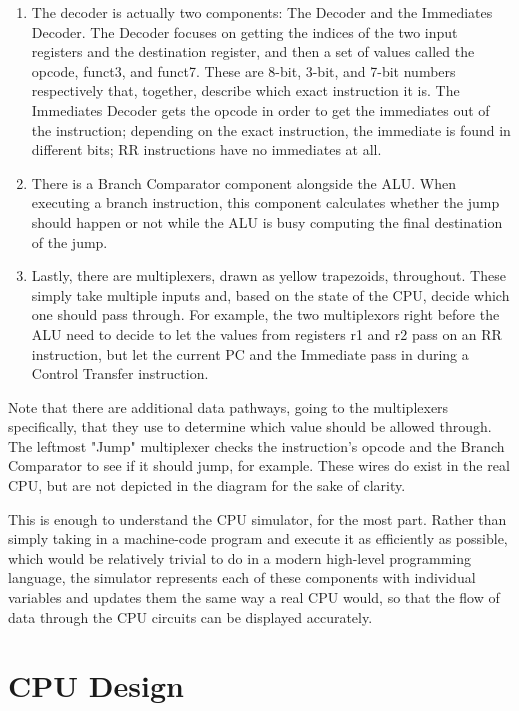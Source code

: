 \documentclass[12pt,twoside]{reedthesis}
\begin{document}
\begin{enumerate}
	\item The decoder is actually two components: The Decoder and the Immediates Decoder. The Decoder focuses on getting the indices of the two input registers and the destination register, and then a set of values called the opcode, funct3, and funct7. These are 8-bit, 3-bit, and 7-bit numbers respectively that, together, describe which exact instruction it is. The Immediates Decoder gets the opcode in order to get the immediates out of the instruction; depending on the exact instruction, the immediate is found in different bits; RR instructions have no immediates at all.

	\item There is a Branch Comparator component alongside the ALU. When executing a branch instruction, this component calculates whether the jump should happen or not while the ALU is busy computing the final destination of the jump.

	\item Lastly, there are multiplexers, drawn as yellow trapezoids, throughout. These simply take multiple inputs and, based on the state of the CPU, decide which one should pass through. For example, the two multiplexors right before the ALU need to decide to let the values from registers r1 and r2 pass on an RR instruction, but let the current PC and the Immediate pass in during a Control Transfer instruction.

\end{enumerate}


Note that there are additional data pathways, going to the multiplexers specifically, that they use to determine which value should be allowed through. The leftmost "Jump" multiplexer checks the instruction's opcode and  the Branch Comparator to see if it should jump, for example. These wires do exist in the real CPU, but are not depicted in the diagram for the sake of clarity.

This is enough to understand the CPU simulator, for the most part. Rather than simply taking in a machine-code program and execute it as efficiently as possible, which would be relatively trivial to do in a modern high-level programming language, the simulator represents each of these components with individual variables and updates them the same way a real CPU would, so that the flow of data through the CPU circuits can be displayed accurately.

\chapter{CPU Design}
\end{document}
